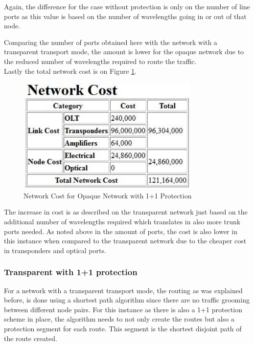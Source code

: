 	Again, the difference for the case without protection is only on the number of line ports as this value is based on the number of wavelengths going in or out of that node.
	
	Comparing the number of ports obtained here with the network with a transparent transport mode, the amount is lower for the opaque network due to the reduced number of wavelengths required to route the traffic. \\
	
	Lastly the total network cost is on Figure \ref{networkCost_Report_Cost_Opaque11}.\\
	
	\begin{figure}[!h]
		\centering
		\includegraphics[width=9cm]{networkCost_Report_Cost_Opaque11.pdf}	
		\caption{Network Cost for Opaque Network with 1+1 Protection}
		\label{networkCost_Report_Cost_Opaque11}								
	\end{figure}	
	
	\pagebreak
	
	The increase in cost is as described on the transparent network just based on the additional number of wavelengths required which translates in also more trunk ports needed. As noted above in the amount of ports, the cost is also lower in this instance when compared to the transparent network due to the cheaper cost in transponders and optical ports.
	
	
	
		\subsubsection{Transparent with 1+1 protection}
		
		
		For a network with a transparent transport mode, the routing as was explained before, is done using a shortest path algorithm since there are no traffic grooming between different node pairs. For this instance as there is also a 1+1 protection scheme in place, the algorithm needs to not only create the routes but also a protection segment for each route. This segment is the shortest disjoint path of the route created.

